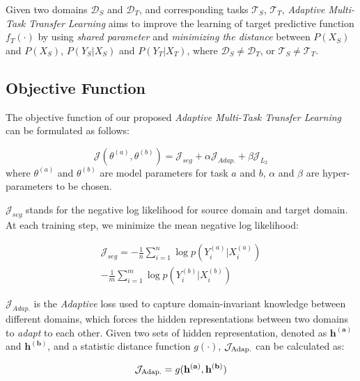 \theoremstyle{definition}
\begin{definition}
Given two domains $\mathcal{D}_S$ and $\mathcal{D}_T$, and corresponding tasks $\mathcal{T}_S$, $\mathcal{T}_T$, \textit{Adaptive Multi-Task Transfer Learning} aims to improve the learning of target predictive function $f_T(\cdot)$ by using \textit{shared parameter} and \textit{minimizing the distance} between $P(X_S)$ and $P(X_S)$, $P(Y_S|X_S)$ and $P(Y_T|X_T)$, where $\mathcal{D}_S \neq \mathcal{D}_T$, or $\mathcal{T}_S \neq \mathcal{T}_T$.
\end{definition}

\subsection{Objective Function}\label{sec:objective}

The objective function of our proposed \textit{Adaptive Multi-Task Transfer Learning} can be formulated as follows:

\small
\begin{equation}\label{eq:objective}
\mathcal{J}(\theta^{(a)}, \theta^{(b)}) = \mathcal{J}_{seg} + \alpha\mathcal{J}_{Adap.} + \beta\mathcal{J}_{L_2}
\end{equation}
\normalsize
where $\theta^{(a)}$ and $\theta^{(b)}$ are model parameters for task $a$ and $b$, $\alpha$ and $\beta$ are hyper-parameters to be chosen.

$\mathcal{J}_{seg}$ stands for the negative log likelihood for source domain and target domain. At each training step, we minimize the mean negative log likelihood:

\small
\begin{equation}
\begin{aligned}
\mathcal{J}_{seg} = -\frac{1}{n}\sum_{i=1}^n\log p(Y_i^{(a)}|X_i^{(a)}) \\ -\frac{1}{m}\sum_{i=1}^m\log p(Y_i^{(b)}|X_i^{(b)})
\end{aligned}
\end{equation}
\normalsize

$\mathcal{J}_{Adap.}$ is the \textit{Adaptive} loss used to capture domain-invariant knowledge between different domains, which forces the hidden representations between two domains to \textit{adapt} to each other. Given two sets of hidden representation, denoted as $\mathbf{h^{(a)}}$ and $\mathbf{h^{(b)}}$, and a statistic distance function $g(\cdot)$, $\mathcal{J}_{\textnormal{Adap.}}$ can be calculated as:

\small
\begin{equation}\label{eq:Adap}
\mathcal{J}_{\textnormal{Adap.}} = g(\mathbf{h^{(a)}}, \mathbf{h^{(b)}})
\end{equation}
\normalsize

